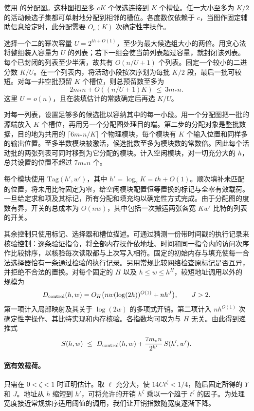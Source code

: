 使用 \cite[Lemma~]{oaG} 的分配图。这种图把至多 $cK$ 个候选连接到 $K$ 个槽位。任一大小至多为 $K/2$ 的活动候选子集都可单射地分配到相邻的槽位。各度数仅依赖于 $c$，当图作固定辅助信息给定时，此分配需要 $O_c(K)$ 次确定性字操作。

选择一个二的幂次容量 $U=2^{th+O(1)}$，至少为最大候选组大小的两倍。用贪心法将整组装入容量为 $U$ 的列表；若下一组会使当前列表超过容量，就封闭该列表。每个已封闭的列表至少半满，故共有 $O(n/U+1)$ 个列表。固定一个较小的二进分数 $K/U$。在一个列表内，将活动小段按次序划为每批 $K/2$ 段，最后一批可较短。对每一非空批预留 $K$ 个槽位，则总预留数至多为 \[
             2m_*n+O((n/U+1)K)\ \le\ 3m_*n .
\] 这里 $U=o(n)$，且在装填估计的常数确定后再选 $K/U$。

对每一列表，设置足够多的候选批以容纳其中的每一小段。用一个分配图把一批的源端放入 $K$ 个槽位，再用另一个分配图处理目的端。第二步的分配对象是整批数据，目的地为共用的 $\lceil6m_*n/K\rceil$ 个物理模块，每个模块有 $K$ 个输入位置和同样多的输出位置。至多半数模块被激活，候选批数至多为模块数的常数倍。因此每个活动批的两张列表可同时移到为它分配的模块。计入空闲模块，对一切充分大的 $h$，总共设置的位置不超过 $7m_*n$ 个。

每个模块使用 $\mathrm{Tag}(h',w')$，其中 $h'=\log_2 K=th+O(1)$。顺次填补未匹配的位置，将未用比特固定为零，给空闲模块配置恒等置换的标记与全零有效载荷。一旦给定求和项及其标记，所有分配和填充均以确定性方式完成。由于分配图的度数有界，开关的总成本为 $O(nw)$，其中包括一次搬运两张各宽 $Kw'$ 比特的列表的开关。

其余控制只使用标记、选择器和槽位描述。可通过猜测一份带时间戳的执行记录来核验控制：逐条验证指令，将全部内存操作依地址、时间和同一指令内的访问次序作比较排序，以核验每次读取都与上次写入相符。固定的初始内存与填充使每一合法选择器恰有一条通过检验的执行记录。另用常规比较网络检查原标记是否互异，并拒绝不合法的置换。对每个固定的 $H$ 以及 $h\le w\le h^H$，较短地址调用以外的规模为 \begin{equation}
  D_{\rm control}(h,w)=
  O_H\bigl(nw(\log(2h))^{O(1)}+n h^J\bigr),\qquad J>2 .
  \label{eq:sort-control}
\end{equation} 第一项计入局部映射及其关于 $\log(2w)$ 的多项式开销。第二项计入 $nh^{O(1)}$ 次确定性字操作、其比特实现和内存核验。各指数均可取为与 $H$ 无关。由此得到递推式 \[
 S(h,w)\ \le\ D_{\rm control}(h,w)
       +\frac{7m_*n}{2^{h'}}\,S(h',w').
\]

\paragraph{宽有效载荷。}只需在 $0<\zeta<1$ 时证明估计。取 $\ell$ 充分大，使 $14C t^\zeta<1/4$，随后固定所得的 $Y$ 和 $J$。地址从 $h$ 缩短到 $h'$，可将允许的开销 $h^\zeta$ 乘以一个趋于 $t^\zeta$ 的因子。为处理宽度接近常规排序适用阈值的调用，我们让开销指数随宽度逐渐下降。

